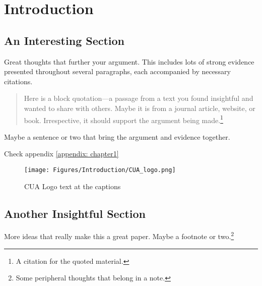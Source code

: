 \chapter{Introduction}
\label{chapter:introduction}

\section{An Interesting Section}
\label{section:interesting_section}

Great thoughts that further your argument. This includes lots of strong evidence presented throughout several paragraphs, each accompanied by necessary citations.
\begin{quotation}
    \noindent Here is a block quotation---a passage from a text you found insightful and wanted to share with others. Maybe it is from a journal article, website, or book. Irrespective, it should support the argument being made.\footnote{A citation for the quoted material.}
\end{quotation}

Maybe a sentence or two that bring the argument and evidence together.\citep{dos_santos_2020}

Check appendix \ref{appendix: chapter1}

\begin{figure} [ht]
\centering
         \texttt{[image: Figures/Introduction/CUA\_logo.png]}
         \caption[CUA Logo text at the List of Figure]{CUA Logo text at the captions}
         \label{CUA-logo-1}
\end{figure}


\section{Another Insightful Section}
\label{section:another_interesting_section}

More ideas that really make this a great paper. Maybe a footnote or two.\footnote{Some peripheral thoughts that belong in a note.}
